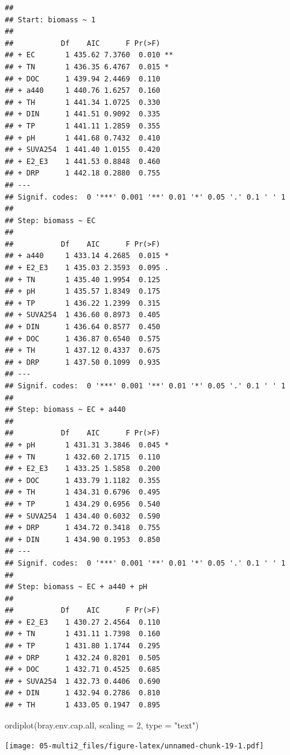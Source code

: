 \documentclass[
]{book}
\newenvironment{Shaded}{\begin{snugshade}}{\end{snugshade}}
\newcommand{\AttributeTok}[1]{\textcolor[rgb]{0.77,0.63,0.00}{#1}}
\newcommand{\DecValTok}[1]{\textcolor[rgb]{0.00,0.00,0.81}{#1}}
\newcommand{\FunctionTok}[1]{\textcolor[rgb]{0.00,0.00,0.00}{#1}}
\newcommand{\NormalTok}[1]{#1}
\newcommand{\StringTok}[1]{\textcolor[rgb]{0.31,0.60,0.02}{#1}}
\begin{document}
\begin{verbatim}
## 
## Start: biomass ~ 1 
## 
##           Df    AIC      F Pr(>F)   
## + EC       1 435.62 7.3760  0.010 **
## + TN       1 436.35 6.4767  0.015 * 
## + DOC      1 439.94 2.4469  0.110   
## + a440     1 440.76 1.6257  0.160   
## + TH       1 441.34 1.0725  0.330   
## + DIN      1 441.51 0.9092  0.335   
## + TP       1 441.11 1.2859  0.355   
## + pH       1 441.68 0.7432  0.410   
## + SUVA254  1 441.40 1.0155  0.420   
## + E2_E3    1 441.53 0.8848  0.460   
## + DRP      1 442.18 0.2880  0.755   
## ---
## Signif. codes:  0 '***' 0.001 '**' 0.01 '*' 0.05 '.' 0.1 ' ' 1
## 
## Step: biomass ~ EC 
## 
##           Df    AIC      F Pr(>F)  
## + a440     1 433.14 4.2685  0.015 *
## + E2_E3    1 435.03 2.3593  0.095 .
## + TN       1 435.40 1.9954  0.125  
## + pH       1 435.57 1.8349  0.175  
## + TP       1 436.22 1.2399  0.315  
## + SUVA254  1 436.60 0.8973  0.405  
## + DIN      1 436.64 0.8577  0.450  
## + DOC      1 436.87 0.6540  0.575  
## + TH       1 437.12 0.4337  0.675  
## + DRP      1 437.50 0.1099  0.935  
## ---
## Signif. codes:  0 '***' 0.001 '**' 0.01 '*' 0.05 '.' 0.1 ' ' 1
## 
## Step: biomass ~ EC + a440 
## 
##           Df    AIC      F Pr(>F)  
## + pH       1 431.31 3.3846  0.045 *
## + TN       1 432.60 2.1715  0.110  
## + E2_E3    1 433.25 1.5858  0.200  
## + DOC      1 433.79 1.1182  0.355  
## + TH       1 434.31 0.6796  0.495  
## + TP       1 434.29 0.6956  0.540  
## + SUVA254  1 434.40 0.6032  0.590  
## + DRP      1 434.72 0.3418  0.755  
## + DIN      1 434.90 0.1953  0.850  
## ---
## Signif. codes:  0 '***' 0.001 '**' 0.01 '*' 0.05 '.' 0.1 ' ' 1
## 
## Step: biomass ~ EC + a440 + pH 
## 
##           Df    AIC      F Pr(>F)
## + E2_E3    1 430.27 2.4564  0.110
## + TN       1 431.11 1.7398  0.160
## + TP       1 431.80 1.1744  0.295
## + DRP      1 432.24 0.8201  0.505
## + DOC      1 432.71 0.4525  0.685
## + SUVA254  1 432.73 0.4406  0.690
## + DIN      1 432.94 0.2786  0.810
## + TH       1 433.05 0.1947  0.895
\end{verbatim}

\begin{Shaded}
\begin{Highlighting}[]
\FunctionTok{ordiplot}\NormalTok{(bray.env.cap.all, }\AttributeTok{scaling =} \DecValTok{2}\NormalTok{, }\AttributeTok{type =} \StringTok{"text"}\NormalTok{)}
\end{Highlighting}
\end{Shaded}

\texttt{[image: 05-multi2\_files/figure-latex/unnamed-chunk-19-1.pdf]}
\end{document}
